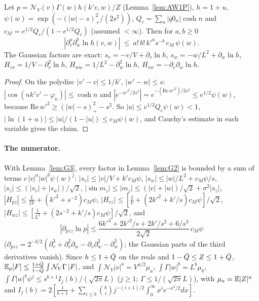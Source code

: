 \begin{lemma} \proofst
\label{lem:G3}
Let $p=\mathcal N_V(v)\Gamma(w)h(k'v,w)/Z$ (Lemma~\ref{lem:AW1P}), $h=1+u$, $\psi(w)=\exp(-(|w|-s)_+^2/(2s^2))$, $Q_c=\sum_n|q0_n|\cosh n$ and
$c_M=e^{1/2}Q_c/(1-e^{1/2}Q_c)$ (assumed $<\infty$). Then for $a,b\ge0$
\begin{equation*}
|\partial_v^a\partial_w^b\ln h(v,w)|\ \le\ a!\,b!\,k'^a s^{-b}\,c_M\,\psi(w).
\end{equation*}
The Gaussian factors are exact: $s_v=-v/V+\partial_v\ln h$, $s_w=-w/L^2+\partial_w\ln h$, $H_{vv}=1/V-\partial_v^2\ln h$, $H_{ww}=1/L^2-\partial_w^2\ln h$, $H_{vw}=-\partial_v\partial_w\ln h$.
\end{lemma}
\begin{proof}
On the polydisc $|v'-v|\le1/k'$, $|w'-w|\le s$: $|\cos(nk'v'-\varphi_n)|\le\cosh n$ and $|e^{-w'^2/2s^2}|=e^{-(\mathrm{Re}\,w'^2)/2s^2}\le e^{1/2}\psi(w)$, because
$\mathrm{Re}\,w'^2\ge(|w|-s)_+^2-s^2$. So $|u|\le e^{1/2}Q_c\psi(w)<1$, $|\ln(1+u)|\le|u|/(1-|u|)\le c_M\psi(w)$, and Cauchy's estimate in each variable gives the claim.
\end{proof}

\paragraph*{The numerator.} With Lemma~\ref{lem:G3}, every factor in Lemma~\ref{lem:G2} is bounded by a sum of terms $c\,|v|^a|w|^b\psi(w)^j$:
$|s_v|\le|v|/V+k'c_M\psi$, $|s_w|\le|w|/L^2+c_M\psi/s$, $|s_z|\le(|s_v|+|s_w|)/\sqrt2$, $|\sin m_z|\le|m_z|\le(|v|+|w|)/\sqrt2+\sigma^2|s_z|$,
$|H_{pz}|\le\frac1{2V}+(k'^2+s^{-2})c_M\psi$, $|H_{vz}|\le[\frac1V+(2k'^2+k'/s)c_M\psi]/\sqrt2$, $|H_{wz}|\le[\frac1{L^2}+(2s^{-2}+k'/s)c_M\psi]/\sqrt2$, and
\begin{equation*}
|\partial_{pzz}\ln p|\le\frac{6k'^3+2k'^2/s+2k'/s^2+6/s^3}{2\sqrt2}\,c_M\psi
\end{equation*}
($\partial_{pzz}=2^{-3/2}(\partial_v^3+\partial_v^2\partial_w-\partial_v\partial_w^2-\partial_w^3)$; the Gaussian parts of the third derivatives vanish). Since $h\le1+\bar Q$ on the
reals and $1-\bar Q\le Z\le1+\bar Q$, $\mathbb{E}_p[F]\le\frac{1+\bar Q}{1-\bar Q}\int\mathcal N_V\Gamma\,|F|$, and
$\int\mathcal N_V|v|^a=V^{a/2}\mu_a$, $\int\Gamma|w|^b=L^b\mu_b$, $\int\Gamma|w|^b\psi^j\le s^{b+1}I_j(b)/(\sqrt{2\pi}L)$ ($j\ge1$; $\Gamma\le1/(\sqrt{2\pi}L)$),
with $\mu_a=\mathbb{E}|Z|^a$ and $I_j(b)=2[\frac1{b+1}+\sum_{i\le b}\binom bij^{-(i+1)/2}\int_0^\infty x^ie^{-x^2/2}dx]$.

